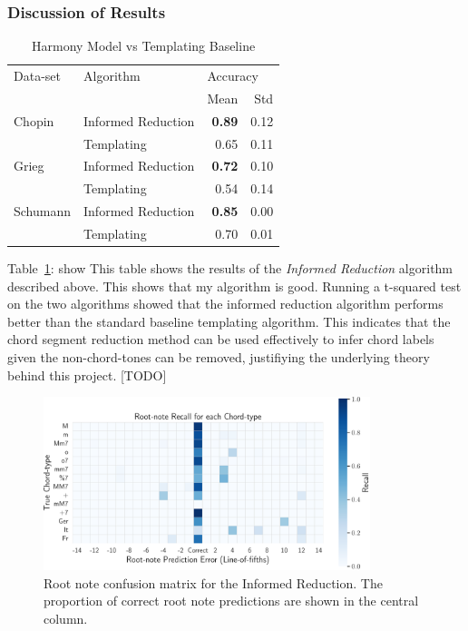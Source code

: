 \documentclass[12pt,a4paper,twoside,openany]{report} \usepackage[pdfborder={0 0 0}]{hyperref}    %
\theoremstyle{definition} \newtheorem{definition}{Definition}[section]
\begin{document}
  \subsubsection{Discussion of Results}
\begin{table}[ht!] 
\caption{Harmony Model vs Templating Baseline} 
\label{tab:informedReductions} 
\centering
\begin{tabular}{llrr}
\toprule
  Data-set       &          Algorithm  & \multicolumn{2}{l}{Accuracy} \\
         &            &     Mean &  Std \\
\toprule
  Chopin & Informed Reduction &     \textbf{0.89} & 0.12 \\
         & Templating &     0.65 & 0.11 \\
\midrule
  Grieg & Informed Reduction &     \textbf{0.72} & 0.10 \\
         & Templating &     0.54 & 0.14 \\
\midrule
  Schumann & Informed Reduction &     \textbf{0.85} & 0.00 \\
         & Templating &     0.70 & 0.01 \\
\bottomrule
\end{tabular}
\end{table}

Table~\ref{tab:informedReductions}: show This table shows the results of the \textit{Informed Reduction} algorithm
described above. This shows that my algorithm is good. Running a t-squared test on the two algorithms showed that the informed reduction
algorithm performs better than the standard baseline templating algorithm. This indicates that the chord segment
reduction method can be used effectively to infer chord labels given the non-chord-tones can be removed, justifiying the
underlying theory behind this project. [TODO]

  \begin{figure}[H]
    \begin{center}
      \includegraphics[width=0.85\textwidth]{figs/eval/Harmony/perfectRootNote.pdf}
    \end{center}
    \caption{Root note confusion matrix for the Informed Reduction. The proportion of correct root note predictions are shown in the central
    column.}
    \label{fig:perfectConfusion}
  \end{figure}
\end{document}
